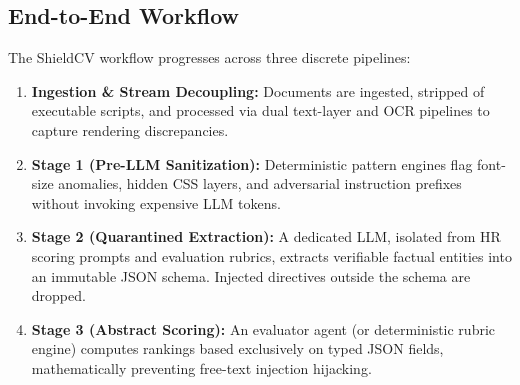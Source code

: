 \documentclass[10pt,twocolumn]{article}
\begin{document}
\subsection{End-to-End Workflow}
The ShieldCV workflow progresses across three discrete pipelines:
\begin{enumerate}
    \item \textbf{Ingestion \& Stream Decoupling:} Documents are ingested, stripped of executable scripts, and processed via dual text-layer and OCR pipelines to capture rendering discrepancies.
    \item \textbf{Stage 1 (Pre-LLM Sanitization):} Deterministic pattern engines flag font-size anomalies, hidden CSS layers, and adversarial instruction prefixes without invoking expensive LLM tokens.
    \item \textbf{Stage 2 (Quarantined Extraction):} A dedicated LLM, isolated from HR scoring prompts and evaluation rubrics, extracts verifiable factual entities into an immutable JSON schema. Injected directives outside the schema are dropped.
    \item \textbf{Stage 3 (Abstract Scoring):} An evaluator agent (or deterministic rubric engine) computes rankings based exclusively on typed JSON fields, mathematically preventing free-text injection hijacking.
\end{enumerate}
\end{document}
